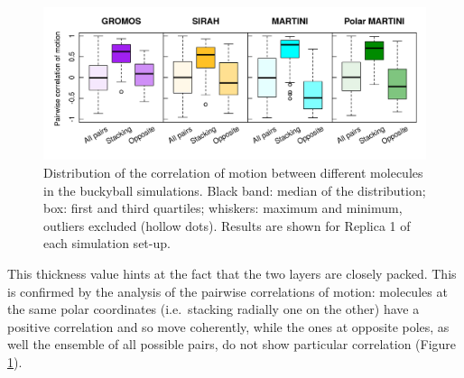 \begin{figure}[t]
\centering
\includegraphics[width=0.95\linewidth]{3results_capsule/pics/RKGBcorr_boxplot_all.png} 
\caption[Correlation of motion between molecules of the buckyball]{Distribution of the correlation of motion between different molecules in the buckyball simulations. Black band: median of the distribution; box: first and third quartiles; whiskers: maximum and minimum, outliers excluded (hollow dots). Results are shown for Replica 1 of each simulation set-up.}
\label{fig:BTI_corr}
\end{figure}
%
This thickness value hints at the fact that the two layers are closely packed. This is confirmed by the analysis of the pairwise correlations of motion:
%
molecules at the same polar coordinates (i.e.\ stacking radially one on the other) have a positive correlation and so move coherently, while the ones at opposite poles, as well the ensemble of all possible pairs, do not show particular correlation (Figure \ref{fig:BTI_corr}). 

